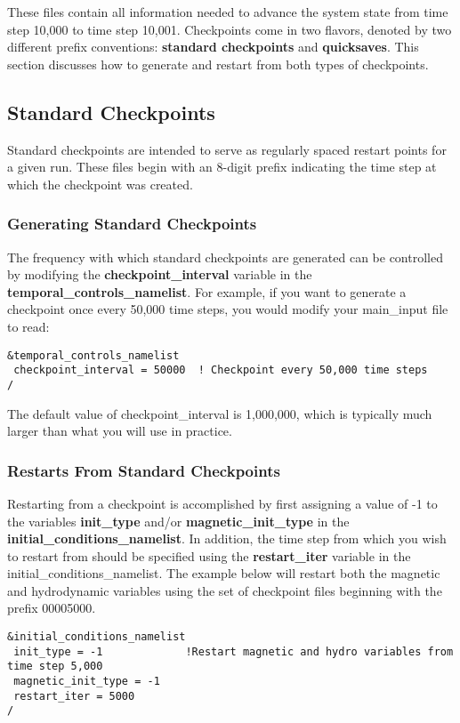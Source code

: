 These files contain all information needed to advance the system state from time step 10,000 to time step 10,001.  Checkpoints come in two flavors, denoted by two different prefix conventions:  \textbf{standard checkpoints} and \textbf{quicksaves}.  This section discusses how to generate and restart from both types of checkpoints.

\subsection{Standard Checkpoints}
Standard checkpoints are intended to serve as regularly spaced restart points for a given run.  These files begin with an 8-digit prefix indicating the time step at which the checkpoint was created. 

\subsubsection{Generating Standard Checkpoints}
The frequency with which standard checkpoints are generated can be controlled by modifying the \textbf{checkpoint\_interval} variable in the \textbf{temporal\_controls\_namelist}.  For example, if you want to generate a checkpoint once every 50,000 time steps, you would modify your main\_input file to read:

\begin{lstlisting}
&temporal_controls_namelist
 checkpoint_interval = 50000  ! Checkpoint every 50,000 time steps 
/
\end{lstlisting}
The default value of checkpoint\_interval is 1,000,000, which is typically much larger than what you will use in practice.  

\subsubsection{Restarts From Standard Checkpoints}
Restarting from a checkpoint is accomplished by first assigning a value of -1 to the variables \textbf{init\_type} and/or \textbf{magnetic\_init\_type} in the \textbf{initial\_conditions\_namelist}.  In addition, the time step from which you wish to restart from should be specified using the \textbf{restart\_iter} variable in the initial\_conditions\_namelist.  The example below will restart both the magnetic and hydrodynamic variables using the set of checkpoint files beginning with the prefix 00005000.
\begin{lstlisting}
&initial_conditions_namelist
 init_type = -1             !Restart magnetic and hydro variables from time step 5,000
 magnetic_init_type = -1
 restart_iter = 5000
/
\end{lstlisting}

